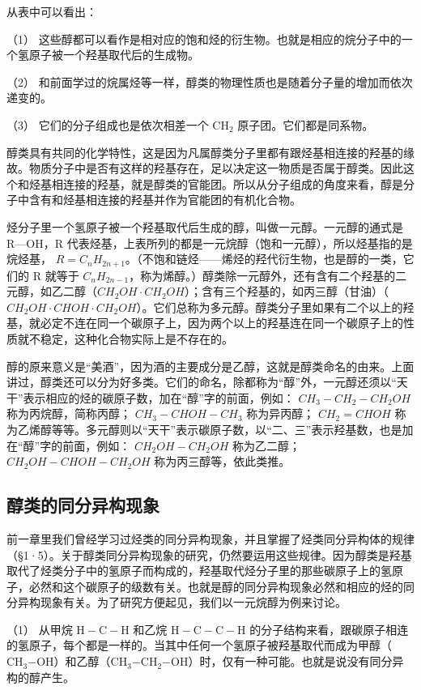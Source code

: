 从表中可以看出：

（1）
这些醇都可以看作是相对应的饱和烃的衍生物。也就是相应的烷分子中的一个氢原子被一个羟基取代后的生成物。

（2）
和前面学过的烷属烃等一样，醇类的物理性质也是随着分子量的增加而依次递变的。

（3） 它们的分子组成也是依次相差一个 \(\mathrm{CH}_{2}\)
原子团。它们都是同系物。

醇类具有共同的化学特性，这是因为凡属醇类分子里都有跟烃基相连接的羟基的缘故。物质分子中是否有这样的羟基存在，足以决定这一物质是否属于醇类。因此这个和烃基相连接的羟基，就是醇类的官能团。所以从分子组成的角度来看，醇是分子中含有和烃基相连接的羟基并作为官能团的有机化合物。

烃分子里一个氢原子被一个羟基取代后生成的醇，叫做一元醇。一元醇的通式是
R---OH，R
代表烃基，上表所列的都是一元烷醇（饱和一元醇），所以烃基指的是烷烃基，
\(R=C_{n}H_{2n+1}\)。（不饱和链烃------烯烃的羟代衍生物，也是醇的一类，它们的
R 就等于
\(C_{n}H_{2n-1}\)，称为烯醇。）醇类除一元醇外，还有含有二个羟基的二元醇，如乙二醇（\(CH_{2}OH\cdot CH_{2}OH\)）；含有三个羟基的，如丙三醇（甘油）（\(CH_{2}OH\cdot CHOH\cdot CH_{2}OH\)）。它们总称为多元醇。醇类分子里如果有二个以上的羟基，就必定不连在同一个碳原子上，因为两个以上的羟基连在同一个碳原子上的性质就不稳定，这种化合物实际上是不存在的。

醇的原来意义是``美酒''，因为酒的主要成分是乙醇，这就是醇类命名的由来。上面讲过，醇类还可以分为好多类。它们的命名，除都称为``醇''外，一元醇还须以``天干''表示相应的烃的碳原子数，加在``醇''字的前面，例如：
\(CH_{3}-CH_{2}-CH_{2}OH\) 称为丙烷醇，简称丙醇； \(CH_{3}-CHOH-CH_{3}\)
称为异丙醇； \(CH_{2}=CHOH\)
称为乙烯醇等等。多元醇则以``天干''表示碳原子数，以``二、三''表示羟基数，也是加在``醇''字的前面，例如：
\(CH_{2}OH-CH_{2}OH\) 称为乙二醇； \(CH_{2}OH-CHOH-CH_{2}OH\)
称为丙三醇等，依此类推。

\subsection{醇类的同分异构现象}

前一章里我们曾经学习过烃类的同分异构现象，并且掌握了烃类同分异构体的规律（§1·5）。关于醇类同分异构现象的研究，仍然要运用这些规律。因为醇类是羟基取代了烃类分子中的氢原子而构成的，羟基取代烃分子里的那些碳原子上的氢原子，必然和这个碳原子的级数有关。也就是醇的同分异构现象必然和相应的烃的同分异构现象有关。为了研究方便起见，我们以一元烷醇为例来讨论。

（1） 从甲烷 \(\mathrm{H}-\mathrm{C}-\mathrm{H}\) 和乙烷
\(\mathrm{H}-\mathrm{C}-\mathrm{C}-\mathrm{H}\)
的分子结构来看，跟碳原子相连的氢原子，每个都是一样的。当其中任何一个氢原子被羟基取代而成为甲醇（\(\mathrm{CH}_3\mathrm{-OH}\)）和乙醇（\(\mathrm{CH}_3\mathrm{-CH}_2\mathrm{-OH}\)）时，仅有一种可能。也就是说没有同分异构的醇产生。

